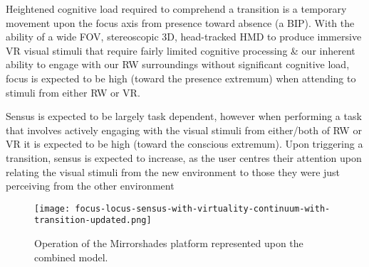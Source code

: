 Heightened cognitive load required to comprehend a transition is a temporary movement upon the focus axis from presence toward absence (a BIP). With the ability of a wide FOV, stereoscopic 3D, head-tracked HMD to produce immersive VR visual stimuli that require fairly limited cognitive processing \& our inherent ability to engage with our RW surroundings without significant cognitive load, focus is expected to be high (toward the presence extremum) when attending to stimuli from either RW or VR.

Sensus is expected to be largely task dependent, however when performing a task that involves actively engaging with the visual stimuli from either/both of RW or VR it is expected to be high (toward the conscious extremum). Upon triggering a transition, sensus is expected to increase, as the user centres their attention upon relating the visual stimuli from the new environment to those they were just perceiving from the other environment






\begin{figure}[h]
	\begin{center}
		\texttt{[image: focus-locus-sensus-with-virtuality-continuum-with-transition-updated.png]}
		\caption{Operation of the Mirrorshades platform represented upon the combined model.}
		\label{focus-locus-sensus-with-virtuality-continuum-with-transition}
	\end{center}	
\end{figure}

